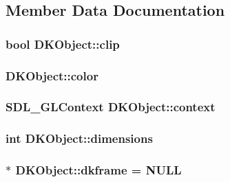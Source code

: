 \subsection{Member Data Documentation}
\hypertarget{class_d_k_object_a4ea538769bd6aac016dc284a88d605ce}{
\subsubsection[{clip}]{\setlength{\rightskip}{0pt plus 5cm}bool D\-K\-Object\-::clip}}\label{class_d_k_object_a4ea538769bd6aac016dc284a88d605ce}
\hypertarget{class_d_k_object_a2a19bb0038eb4cef7ea506982be57706}{
\subsubsection[{color}]{ D\-K\-Object\-::color}}\label{class_d_k_object_a2a19bb0038eb4cef7ea506982be57706}
\hypertarget{class_d_k_object_a39c8018c47b7f5ec35c6ce0fa0079877}{
\subsubsection[{context}]{\setlength{\rightskip}{0pt plus 5cm}S\-D\-L\-\_\-\-G\-L\-Context D\-K\-Object\-::context}}\label{class_d_k_object_a39c8018c47b7f5ec35c6ce0fa0079877}
\hypertarget{class_d_k_object_a1be0b89124027779a047f09dc76e7e59}{
\subsubsection[{dimensions}]{\setlength{\rightskip}{0pt plus 5cm}int D\-K\-Object\-::dimensions}}\label{class_d_k_object_a1be0b89124027779a047f09dc76e7e59}
\hypertarget{class_d_k_object_ae789c24f2508f4e9e6c727b2f420eb4e}{
\subsubsection[{dkframe}]{ $\ast$ D\-K\-Object\-::dkframe = N\-U\-L\-L\hspace{0.3cm}{\ttfamily [static]}}}\label{class_d_k_object_ae789c24f2508f4e9e6c727b2f420eb4e}
